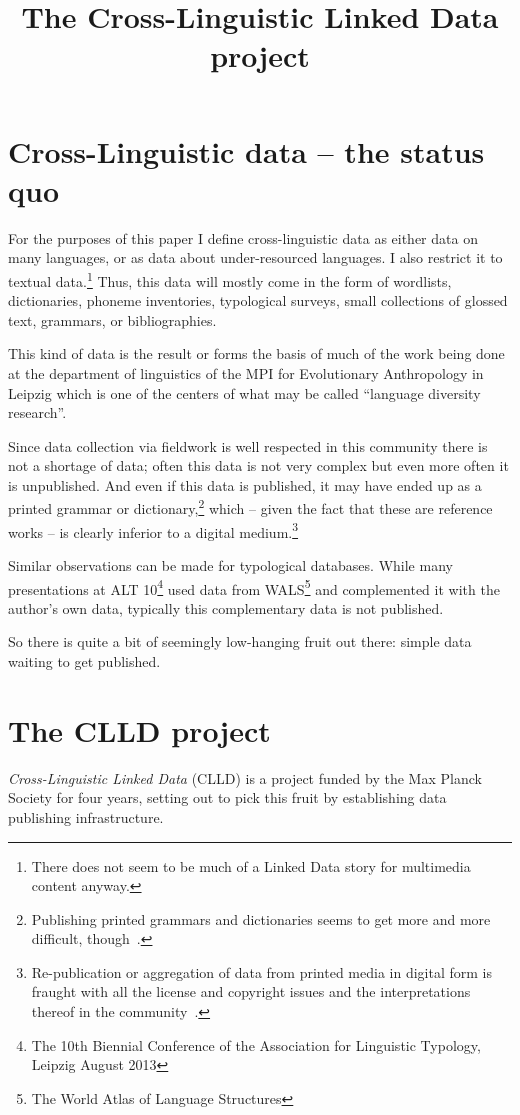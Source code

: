 \documentclass[a4paper,10pt]{article}
\title{The Cross-Linguistic Linked Data project}
\begin{document}
\maketitleabstract

\section{Cross-Linguistic data -- the status quo}
For the purposes of this paper I define cross-linguistic data as either data on many languages, 
or as data about under-resourced languages. I also restrict it to textual data.\footnote{There does not seem to be much of a
Linked Data story for multimedia content anyway.}
Thus, this data will mostly come in the form of 
wordlists, dictionaries, phoneme inventories, typological surveys, small collections of glossed text, grammars, or bibliographies.

This kind of data is the result or forms the basis of much of the work being done at the
department of linguistics of the MPI for Evolutionary Anthropology in Leipzig which is
one of the centers of what may be called ``language diversity research''.

Since data collection via fieldwork is well respected in this community
there is not a shortage of data;
often this data is not very complex but even more often it is unpublished. And even if this data is published, it may have ended up as a printed grammar or dictionary,\footnote{Publishing printed grammars and dictionaries seems to get more and more difficult, though~\cite{dlc631}.} which -- given the fact that these are reference works -- is clearly inferior to a digital medium.\footnote{Re-publication or aggregation of data from printed media in digital form is fraught with all the license and copyright issues and the interpretations thereof in the community~\cite{austin2011}.}

Similar observations can be made for typological databases. While many presentations at ALT 10\footnote{The 10th Biennial Conference of the Association for Linguistic Typology, Leipzig August 2013} used data from WALS\footnote{The World Atlas of Language Structures} and complemented it with the author's own data, typically this complementary data is not published.

So there is quite a bit of seemingly low-hanging fruit out there: simple data waiting to get published.

\section{The CLLD project}
\emph{Cross-Linguistic Linked Data} (CLLD) is a project funded by the Max Planck Society for four years, 
setting out to pick this fruit by establishing data publishing infrastructure.
\end{document}
